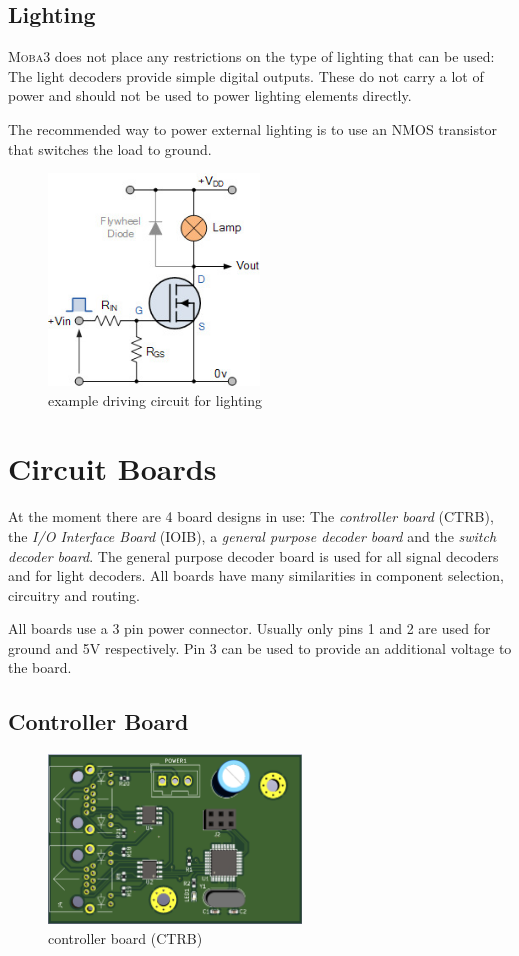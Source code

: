 \documentclass{scrreprt}
\begin{document}
\section{Lighting}
\textsc{Moba3} does not place any restrictions on the type of lighting that can be used:
The light decoders provide simple digital outputs.
These do not carry a lot of power and should not be used to power lighting elements directly.

The recommended way to power external lighting is to use an NMOS transistor that switches the load to ground.

\begin{figure}[h!]
    \centering
    \includegraphics[width=0.5\textwidth]{transistor-tran21}
    \caption{example driving circuit for lighting}
    \label{fig:ctrb}
\end{figure}

\chapter{Circuit Boards}
At the moment there are 4 board designs in use:
The \emph{controller board} (CTRB), the \emph{I/O Interface Board} (IOIB), a \emph{general purpose decoder board} and the \emph{switch decoder board}.
The general purpose decoder board is used for all signal decoders and for light decoders.
All boards have many similarities in component selection, circuitry and routing.

All boards use a 3 pin power connector.
Usually only pins 1 and 2 are used for ground and 5V respectively.
Pin 3 can be used to provide an additional voltage to the board.

\section{Controller Board}
\begin{figure}[h!]
    \centering
    \includegraphics[width=0.6\textwidth]{controller}
    \caption{controller board (CTRB)}
    \label{fig:ctrb}
\end{figure}
\end{document}
